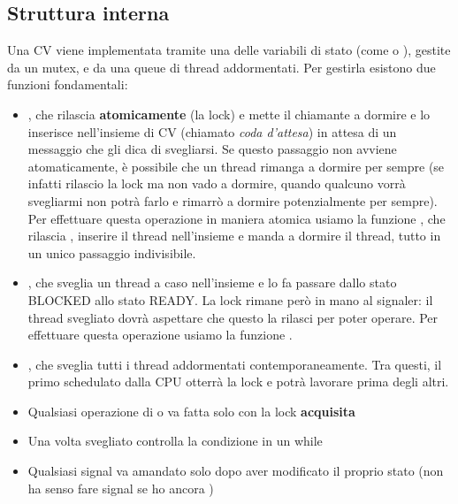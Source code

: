 \documentclass[11pt, a4paper, titlepage, oneside]{scrbook}
\begin{document}
\subsection{Struttura interna}

Una CV viene implementata tramite una delle variabili di stato (come  o ), gestite da un mutex, e da una queue di thread addormentati. Per gestirla esistono due funzioni fondamentali:
\begin{itemize}
    \item {}, che rilascia \textbf{atomicamente}  (la lock) e mette il chiamante a dormire e lo inserisce nell'insieme di CV (chiamato \textit{coda d'attesa}) in attesa di un messaggio che gli dica di svegliarsi. Se questo passaggio non avviene atomaticamente, è possibile che un thread rimanga a dormire per sempre (se infatti rilascio la lock ma non vado a dormire, quando qualcuno vorrà svegliarmi non potrà farlo e rimarrò a dormire potenzialmente per sempre). Per effettuare questa operazione in maniera atomica usiamo la funzione , che rilascia , inserire il thread nell'insieme e manda a dormire il thread, tutto in un unico passaggio indivisibile.
    \item {}, che sveglia un thread a caso nell'insieme e lo fa passare dallo stato BLOCKED allo stato READY. La lock rimane però in mano al signaler: il thread svegliato dovrà aspettare che questo la rilasci per poter operare. Per effettuare questa operazione usiamo la funzione .
    \item {}, che sveglia tutti i thread addormentati contemporaneamente. Tra questi, il primo schedulato dalla CPU otterrà la lock e potrà lavorare prima degli altri.
\end{itemize}

\begin{Proprieta}
\label{prop-regole-CV}
\begin{itemize}
    \item Qualsiasi operazione di  o  va fatta solo con la lock  \textbf{acquisita}
    \item Una volta svegliato controlla la condizione in un while
    \item Qualsiasi signal va amandato solo dopo aver modificato il proprio stato (non ha senso fare signal se ho ancora )
\end{itemize}
\end{Proprieta}
\end{document}
